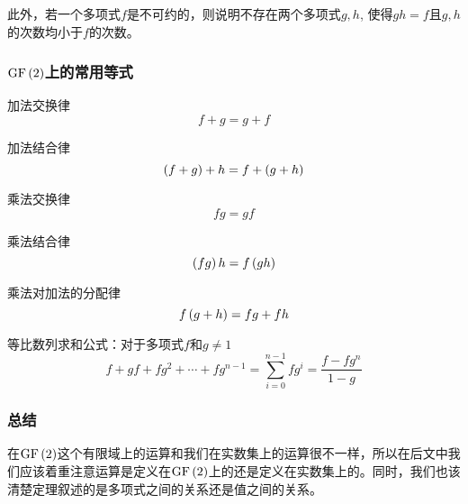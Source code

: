此外，若一个多项式$f$是不可约的，则说明不存在两个多项式$g, h$, 使得$gh=f$且$g, h$的次数均小于$f$的次数。
\subsubsection{$\mathrm{GF}\left( {2}\right)$上的常用等式}
加法交换律
\begin{equation}
    f+g=g+f
\end{equation}

加法结合律
\begin{equation}
    \left( {f+g}\right)+h=f+\left( {g+h}\right)
\end{equation}

乘法交换律
\begin{equation}
    fg=gf
\end{equation}

乘法结合律
\begin{equation}
    \left( {fg}\right)h=f\left( {gh}\right)
\end{equation}

乘法对加法的分配律
\begin{equation}
    f\left( {g+h}\right)=fg+fh
\end{equation}

等比数列求和公式：对于多项式$f$和$g\neq 1$
\begin{equation}
    f+gf+fg^2+\cdots +fg^{n-1}=\sum_{i=0}^{n-1}fg^{i}=\frac{f-fg^{n}}{1-g}
\end{equation}
\subsubsection{总结}
在$\mathrm{GF}\left( {2}\right)$这个有限域上的运算和我们在实数集上的运算很不一样，所以在后文中我们应该着重注意运算是定义在$\mathrm{GF}\left( {2}\right)$上的还是定义在实数集上的。同时，我们也该清楚定理叙述的是多项式之间的关系还是值之间的关系。
